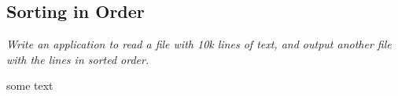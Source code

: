 \subsection{Sorting in Order}
\textit{Write an application to read a file with 10k lines of text, and output another file with the lines in sorted order.}

some text
